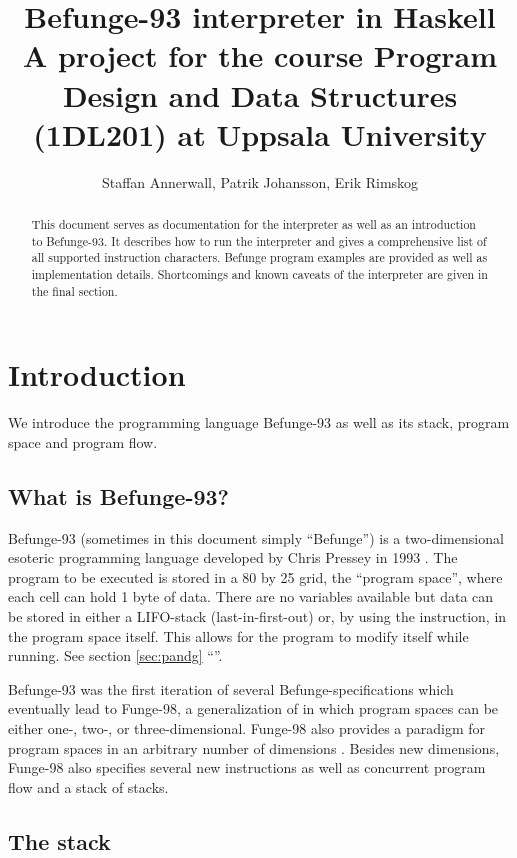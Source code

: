 \documentclass[12pt, a4paper]{article}
\title{Befunge-93 interpreter in Haskell\\
\vspace{5pt}
\small{A project for the course Program Design and Data Structures (1DL201) at Uppsala University}}
\author{Staffan Annerwall, Patrik Johansson, Erik Rimskog}
\begin{document}
\maketitle

\begin{abstract}
This document serves as documentation for the interpreter as well as an introduction to Befunge-93. It describes how to run the interpreter and gives a comprehensive list of all supported instruction characters. Befunge program examples are provided as well as implementation details. Shortcomings and known caveats of the interpreter are given in the final section.
\end{abstract}

\newpage

\tableofcontents

\newpage

\section{Introduction}
We introduce the programming language Befunge-93 as well as its stack, program space and program flow.
\label{sec:intro}

\subsection{What is Befunge-93?}
\label{sec:whatis}

Befunge-93 (sometimes in this document simply “Befunge”) is a two-dimensional esoteric programming language developed by Chris Pressey in 1993 \cite{esolangs}. The program to be executed is stored in a 80 by 25 grid, the “program space”, where each cell can hold 1 byte of data. There are no variables available but data can be stored in either a LIFO-stack (last-in-first-out) or, by using the  instruction, in the program space itself. This allows for the program to modify itself while running. See section \ref{sec:pandg} “”.

Befunge-93 was the first iteration of several Befunge-specifications which eventually lead to Funge-98, a generalization of in which program spaces can be either one-, two-, or three-dimensional. Funge-98 also provides a paradigm for program spaces in an arbitrary number of dimensions \cite{funge98}. Besides new dimensions, Funge-98 also specifies several new instructions as well as concurrent program flow and a stack of stacks.

\subsection{The stack}
\label{sec:stack}
\end{document}

